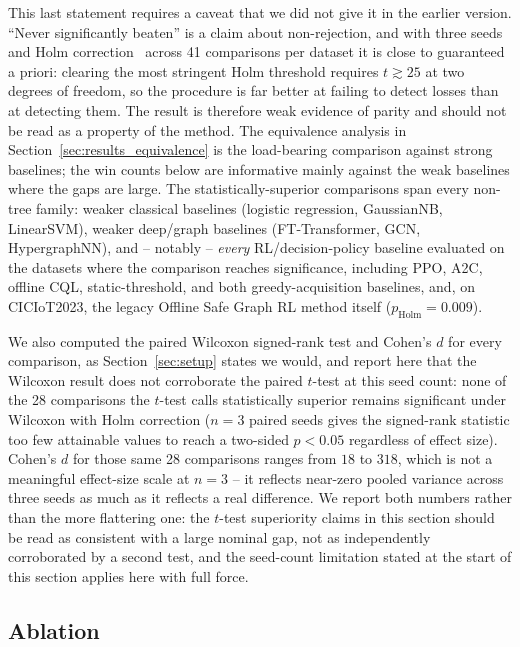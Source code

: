 \documentclass[journal]{IEEEtran}
\begin{document}
This last statement requires a caveat that we did not give it in the earlier
version. ``Never significantly beaten'' is a claim about non-rejection, and
with three seeds and Holm correction~\cite{holm1979} across 41 comparisons
per dataset it is close to guaranteed a priori: clearing the most stringent
Holm threshold requires $t \gtrsim 25$ at two degrees of freedom, so the
procedure is far better at failing to detect losses than at detecting them.
The result is therefore weak evidence of parity and should not be read as a
property of the method. The equivalence analysis in
Section~\ref{sec:results_equivalence} is the load-bearing comparison against
strong baselines; the win counts below are informative mainly against the
weak baselines where the gaps are large. The statistically-superior comparisons span every
non-tree family: weaker classical baselines (logistic regression, GaussianNB,
LinearSVM), weaker deep/graph baselines (FT-Transformer, GCN, HypergraphNN),
and -- notably -- \emph{every} RL/decision-policy baseline evaluated on the
datasets where the comparison reaches significance, including PPO, A2C,
offline CQL, static-threshold, and both greedy-acquisition baselines, and,
on CICIoT2023, the legacy Offline Safe Graph RL method itself
($p_{\text{Holm}}{=}0.009$).

We also computed the paired Wilcoxon signed-rank test and Cohen's $d$ for
every comparison, as Section~\ref{sec:setup} states we would, and report
here that the Wilcoxon result does not corroborate the paired $t$-test at
this seed count: none of the 28 comparisons the $t$-test calls
statistically superior remains significant under Wilcoxon with Holm
correction ($n=3$ paired seeds gives the signed-rank statistic too few
attainable values to reach a two-sided $p<0.05$ regardless of effect size).
Cohen's $d$ for those same 28 comparisons ranges from $18$ to $318$, which
is not a meaningful effect-size scale at $n=3$ -- it reflects near-zero
pooled variance across three seeds as much as it reflects a real
difference. We report both numbers rather than the more flattering one:
the $t$-test superiority claims in this section should be read as
consistent with a large nominal gap, not as independently corroborated by
a second test, and the seed-count limitation stated at the start of this
section applies here with full force.

\subsection{Ablation}
\label{sec:results_ablation}

\end{document}
